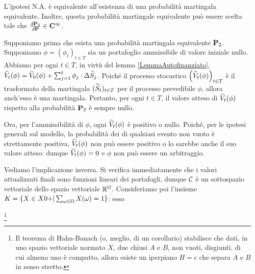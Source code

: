 \begin{Theorem}
	 L'ipotesi N.A. \`e equivalente all'esistenza di una probabilit\`a martingala equivalente. Inoltre, questa probabilit\`a martingale equivalente pu\`o essere scelta tale che $\DensityVersion{\Probability_2}{\Probability} \in \DerivClass{\infty}$.
\end{Theorem}
\Proof Supponiamo prima che esista una probabilit\`a martingala equivalente $\Probability_2$. Supponiamo $\phi = (\phi_t)_{t \in T}$ sia un portafoglio ammissibile di valore iniziale nullo. Abbiamo per ogni $t \in T$, in virt\`u del lemma \ref{LemmaAutofinanziato}, $\widetilde{V}_t(\phi) = \widetilde{V}_0(\phi) + \sum_{j = 1}^t \phi_j \cdot \Delta \widetilde{S}_j$. Poich\'e il processo stocastico $\left ( \widetilde{V}_t(\phi) \right )_{t \in T}$ \`e il trasformato della martingala $(\widetilde{S}_t)_{t \in T}$ per il processo prevedibile $\phi$, allora anch'esso \`e una martingala. Pertanto, per ogni $t \in T$, il valore atteso di $\widetilde{V}_t(\phi)$ rispetto alla probabilit\`a $\Probability_2$ \`e sempre nullo.
\par Ora, per l'ammissibilit\`a di $\phi$, ogni $\widetilde{V}_t(\phi)$ \`e positivo o nullo. Poich\'e, per le ipotesi generali sul modello, la probabilit\`a dei di qualsiasi evento non vuoto \`e strettamente positiva, $\widetilde{V}_t(\phi)$ non pu\`o essere positivo o lo sarebbe anche il suo valore atteso: dunque $\widetilde{V}_t(\phi) = 0$ e $\phi$ non pu\`o essere un arbitraggio.
\par Vediamo l'implicazione inversa. Si verifica immediatamente che i valori attualizzati finali sono funzioni lineari dei portafogli, dunque $\mathcal{C}$ \`e un sottospazio vettoriale dello spazio vettoriale $\mathbb{R}^\Omega$. Consideriamo poi l'insieme $K = \lbrace X \in X{0}{+} | \sum_{\omega \in \Omega} X(\omega) = 1 \rbrace$: esso 

\footnote{Il teorema di Hahn-Banach (o, meglio, di un corollario) stabilisce che dati, in uno spazio vettoriale normato $X$, due chiusi $A$ e $B$, non vuoti, disgiunti, di cui almeno uno \`e compatto, allora esiste un iperpiano $H = c$ che separa $A$ e $B$ in senso stretto.}
